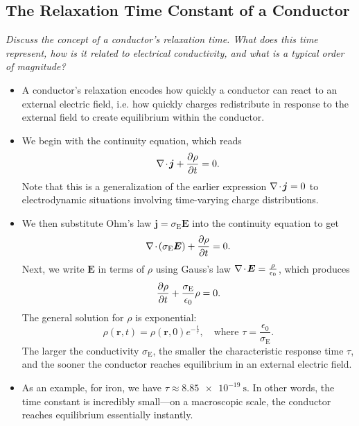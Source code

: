 \documentclass[11pt, a4paper]{article}
\renewcommand{\vec}[1]{\bm{#1}} %
\renewcommand{\r}{\vec{r}}
\newcommand{\E}{\vec{E}} %
\newcommand{\ee}{\epsilon_{0}}  %
\renewcommand{\j}{\vec{j}}  %
\renewcommand{\div}{\nabla \mspace{-2mu} \cdot \mspace{-2mu}}
\begin{document}
\subsection{The Relaxation Time Constant of a Conductor}
\textit{Discuss the concept of a conductor's relaxation time. What does this time represent, how is it related to electrical conductivity, and what is a typical order of magnitude?}

\begin{itemize}
	\item A conductor's relaxation encodes how quickly a conductor can react to an external electric field, i.e. how quickly charges redistribute in response to the external field to create equilibrium within the conductor.
	
	\item We begin with the continuity equation, which reads
	\begin{equation*}
		\div \j + \pdv{\rho}{t} = 0.
	\end{equation*}
	Note that this is a generalization of the earlier expression $ \div \j = 0 $ to electrodynamic situations involving time-varying charge distributions. 
	
	\item We then substitute Ohm's law $ \j = \sigma_{\mathrm{E}}\E $ into the continuity equation to get
	\begin{equation*}
		\div (\sigma_{\mathrm{E}} \E) + \pdv{\rho}{t} = 0.
	\end{equation*}
	Next, we write $ \E $ in terms of $ \rho $ using Gauss's law $ \div \E = \frac{\rho}{\ee} $, which produces
	\begin{equation*}
		\pdv{\rho}{t} + \frac{\sigma_{\mathrm{E}}}{\ee} \rho = 0.
	\end{equation*}
	The general solution for $ \rho $ is exponential:
	\begin{equation*}
        \rho(\r, t) = \rho(\r, 0)e^{-\frac{t}{\tau}}, \quad \text{where } \tau = \frac{\ee}{\sigma_{\text{E}}}.
	\end{equation*}
	The larger the conductivity $ \sigma_{\mathrm{E}} $, the smaller the characteristic response time $ \tau $, and the sooner the conductor reaches equilibrium in an external electric field. 
	
	\item As an example, for iron, we have $ \tau \approx \SI{8.85e-19}{\second} $. In other words, the time constant is incredibly small---on a macroscopic scale, the conductor reaches equilibrium essentially instantly.
	
\end{itemize}
\end{document}
